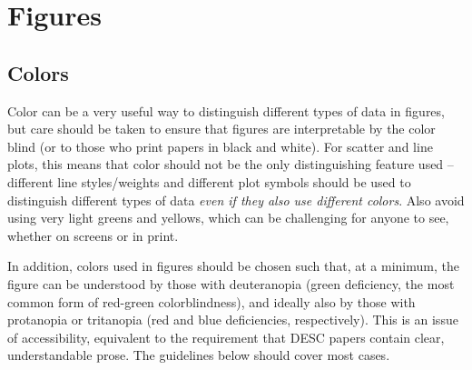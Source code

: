 \documentclass[letterpaper,11pt]{article}
\begin{document}
%

\section{Figures}

\subsection{Colors} \label{sec:figcolor}

Color can be a very useful way to distinguish different types of data in figures, but care should be taken to ensure that figures are interpretable by the color blind (or to those who print papers in black and white). For scatter and line plots, this means that color should not be the only distinguishing feature used -- different line styles/weights and different plot symbols should be used to distinguish different types of data \emph{even if they also use different colors}. Also avoid using very light greens and yellows, which can be challenging for anyone to see, whether on screens or in print.

In addition, colors used in figures should be chosen such that, at a minimum, the figure can be understood by those with deuteranopia (green deficiency, the most common form of red-green colorblindness), and ideally also by those with protanopia or tritanopia (red and blue deficiencies, respectively). This is an issue of accessibility, equivalent to the requirement that DESC papers contain clear, understandable prose. The guidelines below should cover most cases.
\end{document}
